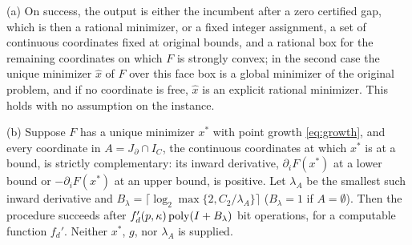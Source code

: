 \begin{theorem}\label{thm:boundary}
(a) On success, the output is either the incumbent after a zero certified
gap, which is then a rational minimizer, or a fixed integer assignment, a set
of continuous coordinates fixed at original bounds, and a rational box for the
remaining coordinates on which $F$ is strongly convex; in the second case the
unique minimizer $\hat x$ of $F$ over this face box is a global minimizer of
the original problem, and if no coordinate is free, $\hat x$ is an explicit
rational minimizer. This holds with no assumption on the instance.

(b) Suppose $F$ has a unique minimizer $x^*$ with point growth
\eqref{eq:growth}, and every coordinate in $A=J_\partial\cap I_C$, the
continuous coordinates at which $x^*$ is at a bound, is strictly complementary:
its inward derivative, $\partial_iF(x^*)$ at a lower bound or
$-\partial_iF(x^*)$ at an upper bound, is positive. Let $\lambda_A$ be the
smallest such inward derivative and
$B_\lambda=\lceil\log_2\max\{2,C_2/\lambda_A\}\rceil$ ($B_\lambda=1$ if
$A=\emptyset$). Then the procedure succeeds after
$f_d'(p,\kappa)\operatorname{poly}(I+B_\lambda)$ bit operations, for a computable function
$f_d'$. Neither $x^*$, $g$, nor $\lambda_A$ is supplied.
\end{theorem}

